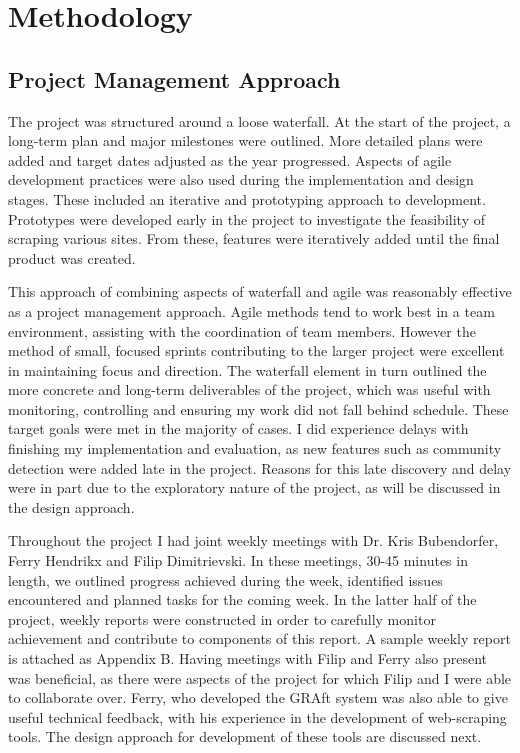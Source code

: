 \chapter{Methodology}\label{C:us}

\section{Project Management Approach}



The project was structured around a loose waterfall. At the start of the project, a long-term plan and major milestones were outlined. More detailed plans were added and target dates adjusted as the year progressed. Aspects of agile development practices were also used during the implementation and design stages. These included an iterative and prototyping approach to development. Prototypes were developed early in the project to investigate the feasibility of scraping various sites. From these, features were iteratively added until the final product was created.

This approach of combining aspects of waterfall and agile was reasonably effective as a project management approach. Agile methods tend to work best in a team environment, assisting with the coordination of team members. However the method of small, focused sprints contributing to the larger project were excellent in maintaining focus and direction. The waterfall element in turn outlined the more concrete and long-term deliverables of the project, which was useful with monitoring, controlling and ensuring my work did not fall behind schedule. These target goals were met in the majority of cases. I did experience delays with finishing my implementation and evaluation, as new features such as community detection were added late in the project. Reasons for this late discovery and delay were in part due to the exploratory nature of the project, as will be discussed in the design approach.

Throughout the project I had joint weekly meetings with Dr. Kris Bubendorfer,  Ferry Hendrikx and Filip Dimitrievski. In these meetings, 30-45 minutes in length, we outlined progress achieved during the week, identified issues encountered and planned tasks for the coming week. In the latter half of the project, weekly reports were constructed in order to carefully monitor achievement and contribute to components of this report. A sample weekly report is attached as Appendix B. Having meetings with Filip and Ferry also present was beneficial, as there were aspects of the project for which Filip and I were able to collaborate over. Ferry, who developed the GRAft system was also able to give useful technical feedback, with his experience in the development of web-scraping tools. The design approach for development of these tools are discussed next.

